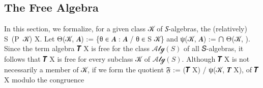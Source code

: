 \documentclass[a4paper,UKenglish,cleveref,autoref,thm-restate]{lipics-v2021}
\begin{document}
\begin{comment}
\subsubsection{Class identities}\label{class-identities}
It follows from \af{V-id1} that, if \ab 𝒦 is a class of structures, then the collection of identities modeled by all structures in \ab 𝒦 is precisely the collection of identities modeled by all structures in \af V \ab 𝒦.  The latter is denoted \AgdaFunction{Th}(\AgdaDatatype{V} \AgdaBound{𝒦}).
\ccpad
\begin{code}%
  
\end{code}
\end{comment}























\subsection{The Free Algebra}\label{ssec:free-algebra-type}
In this section, we formalize, for a given class \ab 𝒦 of \ab 𝑆-algebras, the (relatively)  \ad S~(\ad P~\ab 𝒦)  \ab X. Let \af Θ(\ab 𝒦, \ab 𝑨) := \{\ab θ \af ∈  \ab 𝑨 \as : \ab 𝑨 \af / \ab θ \af ∈ \ad S \ab 𝒦\} and \af ψ(\ab 𝒦, \ab 𝑨) := \af ⋂ \af Θ(\ab 𝒦, ).
Since the term algebra \af 𝑻 \ab X is free for the class $𝒜𝓁ℊ(𝑆)$ of all \ab 𝑆-algebras, it follows that \af 𝑻 \ab X is free for every subclass \ab 𝒦 of $𝒜𝓁ℊ(𝑆)$. Although \af 𝑻 \ab X is not necessarily a member of \ab 𝒦, if we form the quotient 𝔉 \as := (\ab 𝑻 \ab X) \af / \af ψ(\ab 𝒦, \af 𝑻 \ab X), of \af 𝑻 \ab X modulo the congruence
\end{document}
